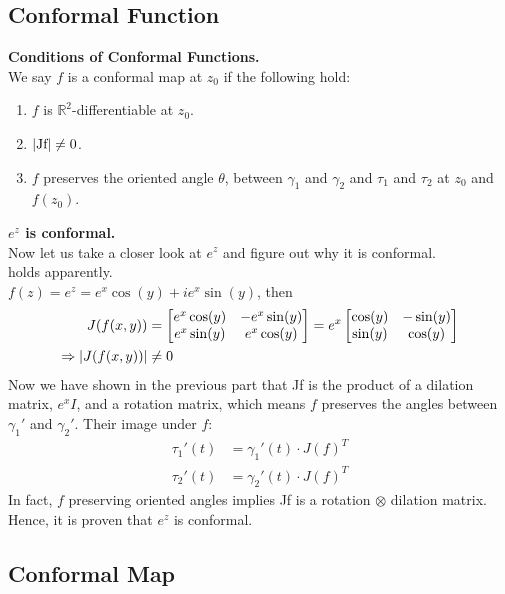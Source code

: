 \documentclass[11pt]{article}
\newcommand*\circled[1]{\tikz[baseline=(char.base)]{
            \node[shape=circle,draw,inner sep=2pt] (char) {#1};}}
\DeclarePairedDelimiter\abs{\lvert}{\rvert}
\begin{document}
\subsection{Conformal Function}
\textbf{Conditions of Conformal Functions.}\\
We say $f$ is a conformal map at $z_0$ if the following hold: 
\begin{enumerate}[leftmargin = *, nolistsep]
\item $f$ is $\mathbb{R}^2$-differentiable at $z_0$.
\item $\abs{\mbox{Jf}} \neq 0$.
\item $f$ preserves the oriented angle $\theta$, between $\gamma_1$ and $\gamma_2$ and $\tau_1$ and $\tau_2$ at $z_0$ and $f(z_0)$. \\
\end{enumerate} 

\textbf{$e^z$ is conformal.}\\
Now let us take a closer look at $e^z$ and figure out why it is conformal. \\
\circled{\scriptsize1} holds apparently. \\
\circled{\scriptsize2} $f(z) = e^z = e^x\cos(y) + ie^x\sin(y)$, then 
\begin{align*}
J(f(x, y)) &= 
\begin{bmatrix}
 e^x\cos(y) & -e^x\sin(y) \\
 e^x\sin(y) & e^x\cos(y)
\end{bmatrix}
=e^x
\begin{bmatrix}
\cos(y) & -\sin(y) \\
\sin(y) & \cos(y)
\end{bmatrix} \\ 
\Rightarrow \abs{J(f(x,y))} &\neq 0\\
\end{align*}
\circled{\scriptsize3} Now we have shown in the previous part that Jf is the product of a dilation matrix, $e^xI$, and a rotation matrix, which means $f$ preserves the angles between $\gamma_1'$ and $\gamma_2'$. Their image under $f$: 
\begin{align*}
\tau_1'(t) &= \gamma_1'(t) \cdot J(f)^T\\
\tau_2'(t) &= \gamma_2'(t) \cdot J(f)^T
\end{align*}
In fact, $f$ preserving oriented angles implies Jf is a rotation $\otimes$ dilation matrix. \\
Hence, it is proven that $e^z$ is conformal.
\subsection{Conformal Map} 
\end{document}
